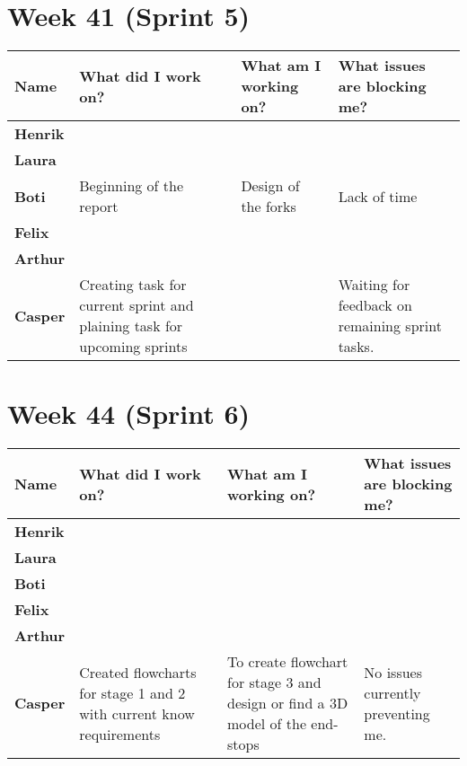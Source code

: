\documentclass[landscape]{article}
\begin{document}
    \section{Week 41 (Sprint 5)}
    \begin{table}[H]
        \begin{center}
            \begin{tabularx}{\linewidth}{L|L|L|L}
                
                \textbf{Name} & \textbf{What did I work on?} & \textbf{What am I working on? }& \textbf{What issues are blocking me?} \\
                \hline
                \textbf{Henrik} &  &  &  \\
                \hline
                \textbf{Laura} & & & \\
                \hline
                \textbf{Boti} & Beginning of the report & Design of the forks & Lack of time \\
                \hline
                \textbf{Felix} & & & \\
                \hline
                \textbf{Arthur} & & & \\
                \hline
                \textbf{Casper} & Creating task for current sprint and plaining
                task for upcoming sprints  &  & Waiting for feedback on
                remaining sprint tasks.
            \end{tabularx}
        \end{center}
    \end{table}

    \section{Week 44 (Sprint 6)}
    \begin{table}[H]
        \begin{center}
            \begin{tabularx}{\linewidth}{L|L|L|L}
                
                \textbf{Name} & \textbf{What did I work on?} & \textbf{What am I working on? }& \textbf{What issues are blocking me?} \\
                \hline
                \textbf{Henrik} &  &  &  \\
                \hline
                \textbf{Laura} & & & \\
                \hline
                \textbf{Boti} & & & \\
                \hline
                \textbf{Felix} & & & \\
                \hline
                \textbf{Arthur} & & & \\
                \hline
                \textbf{Casper} & Created flowcharts for stage 1 and 2 with
                current know requirements & To create flowchart for stage 3 and
                design or find a 3D model of the end-stops & No issues
                currently preventing me. 
            \end{tabularx}
        \end{center}
    \end{table}
\end{document}
